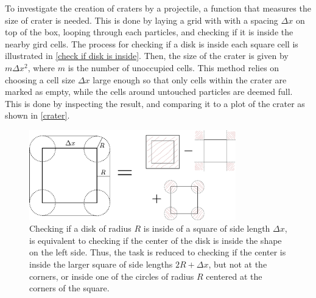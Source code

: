 \documentclass{article}
\begin{document}
    To investigate the creation of craters by a projectile, a function that measures the size of crater is needed.
    This is done by laying a grid with with a spacing $\Delta x$ on top of the box, looping through each particles, and checking if it is inside the nearby gird cells.
    The process for checking if a disk is inside each square cell is illustrated in \autoref{check if disk is inside}.
    Then, the size of the crater is given by $m \Delta x^2$, where $m$ is the number of unoccupied cells.
    This method relies on choosing a cell size $\Delta x$ large enough so that only cells within the crater are marked as empty, while the cells around untouched particles are deemed full.
    This is done by inspecting the result, and comparing it to a plot of the crater as shown in \autoref{crater}.


    \begin{figure}[H]
        \centering
        \includegraphics[width=0.8\textwidth]{figure.pdf}
        \caption{Checking if a disk of radius $R$ is inside of a square of side length $\Delta x$, is equivalent to checking if the center of the disk is inside the shape on the left side.
        Thus, the task is reduced to checking if the center is inside the larger square of side lengths $2R + \Delta x$, but not at the corners, or inside one of the circles of radius $R$ centered at the corners of the square.}
        \label{check if disk is inside}
    \end{figure}
\end{document}
